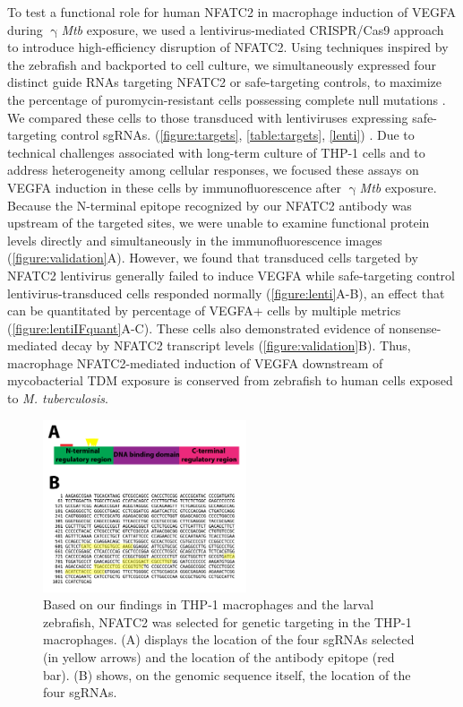 To test a functional role for human NFATC2 in macrophage induction of VEGFA during $\upgamma$\textit{Mtb} exposure, we used a lentivirus\hyp{}mediated CRISPR/Cas9 approach to introduce high\hyp{}efficiency disruption of NFATC2. Using techniques inspired by the zebrafish and backported to cell culture, we simultaneously expressed four distinct guide RNAs targeting NFATC2 or safe\hyp{}targeting controls, to maximize the percentage of puromycin\hyp{}resistant cells possessing complete null mutations \citep{Wu2018}. We compared these cells to those transduced with lentiviruses expressing safe\hyp{}targeting control sgRNAs. (\autoref{figure:targets}, \autoref{table:targets}, \autoref{lenti}) \citep{Kabadi2014, Sanjana2014, Morgens2017, Kitamura2021}. Due to technical challenges associated with long\hyp{}term culture of THP\hyp{}1 cells and to address heterogeneity among cellular responses, we focused these assays on VEGFA induction in these cells by immunofluorescence after $\upgamma$\textit{Mtb} exposure. Because the N\hyp{}terminal epitope recognized by our NFATC2 antibody was upstream of the targeted sites, we were unable to examine functional protein levels directly and simultaneously in the immunofluorescence images (\autoref{figure:validation}A). However, we found that transduced cells targeted by NFATC2 lentivirus generally failed to induce VEGFA while safe\hyp{}targeting control lentivirus\hyp{}transduced cells responded normally (\autoref{figure:lenti}A\hyp{}B), an effect that can be quantitated by percentage of VEGFA+ cells by multiple metrics (\autoref{figure:lentiIFquant}A\hyp{}C). These cells also demonstrated evidence of nonsense\hyp{}mediated decay by NFATC2 transcript levels (\autoref{figure:validation}B). Thus, macrophage NFATC2\hyp{}mediated induction of VEGFA downstream of mycobacterial TDM exposure is conserved from zebrafish to human cells exposed to \textit{M. tuberculosis}.

\begin{figure}
\centering
\includegraphics[height=2in]{images/lentitargets.pdf}
\caption{Based on our findings in THP\hyp{}1 macrophages and the larval zebrafish, NFATC2 was selected for genetic targeting in the THP\hyp{}1 macrophages. (A) displays the location of the four sgRNAs selected (in yellow arrows) and the location of the antibody epitope (red bar). (B) shows, on the genomic sequence itself, the location of the four sgRNAs.}
\label{figure:targets}
\end{figure}

